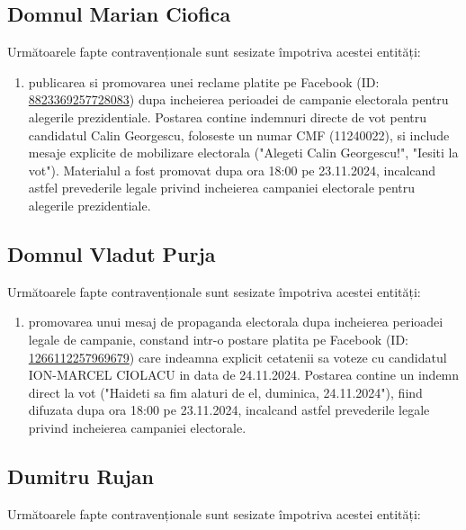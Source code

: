\documentclass[a4paper,12pt]{article}
\begin{document}
\vspace{0.5cm}

\subsection{Domnul Marian Ciofica}
Următoarele fapte contravenționale sunt sesizate împotriva acestei entități:

\begin{enumerate}[leftmargin=*, label=\arabic*.)]
    \item publicarea si promovarea unei reclame platite pe Facebook (ID: \href{https://www.facebook.com/ads/library/?id=8823369257728083}{8823369257728083}) dupa incheierea perioadei de campanie electorala pentru alegerile prezidentiale. Postarea contine indemnuri directe de vot pentru candidatul Calin Georgescu, foloseste un numar CMF (11240022), si include mesaje explicite de mobilizare electorala ("Alegeti Calin Georgescu!", "Iesiti la vot"). Materialul a fost promovat dupa ora 18:00 pe 23.11.2024, incalcand astfel prevederile legale privind incheierea campaniei electorale pentru alegerile prezidentiale.
\end{enumerate}

\vspace{0.5cm}

\subsection{Domnul Vladut Purja}
Următoarele fapte contravenționale sunt sesizate împotriva acestei entități:

\begin{enumerate}[leftmargin=*, label=\arabic*.)]
    \item promovarea unui mesaj de propaganda electorala dupa incheierea perioadei legale de campanie, constand intr-o postare platita pe Facebook (ID: \href{https://www.facebook.com/ads/library/?id=1266112257969679}{1266112257969679}) care indeamna explicit cetatenii sa voteze cu candidatul ION-MARCEL CIOLACU in data de 24.11.2024. Postarea contine un indemn direct la vot ("Haideti sa fim alaturi de el, duminica, 24.11.2024"), fiind difuzata dupa ora 18:00 pe 23.11.2024, incalcand astfel prevederile legale privind incheierea campaniei electorale.
\end{enumerate}

\vspace{0.5cm}

\subsection{Dumitru Rujan}
Următoarele fapte contravenționale sunt sesizate împotriva acestei entități:
\end{document}
